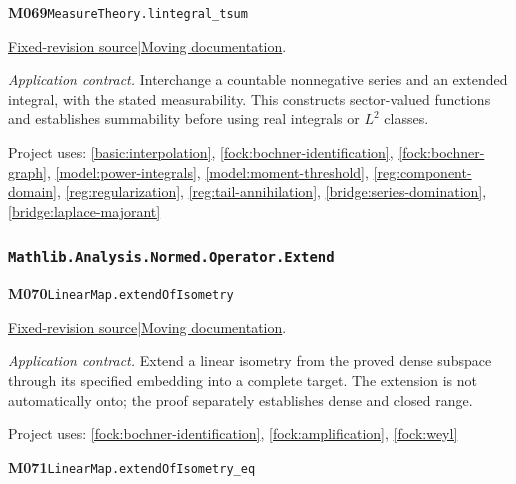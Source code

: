 \documentclass[11pt,a4paper]{article}
\theoremstyle{definition}
\theoremstyle{remark}
\begin{document}
\noindent\textbf{M069}\label{base:M069}\quad\nolinkurl{MeasureTheory.lintegral_tsum}

\href{https://github.com/leanprover-community/mathlib4/blob/9bac2d0692944a775113f7c130fd5e5b4608a854/Mathlib/MeasureTheory/Integral/Lebesgue/Add.lean}{Fixed-revision source}\quad|\quad\href{https://leanprover-community.github.io/mathlib4_docs/Mathlib/MeasureTheory/Integral/Lebesgue/Add.html#MeasureTheory.lintegral_tsum}{Moving documentation}.\par
\noindent\textit{Application contract.} Interchange a countable nonnegative series and an extended integral, with the stated measurability. This constructs sector-valued functions and establishes summability before using real integrals or $L^2$ classes.\par
{\small Project uses: \ref{basic:interpolation}, \ref{fock:bochner-identification}, \ref{fock:bochner-graph}, \ref{model:power-integrals}, \ref{model:moment-threshold}, \ref{reg:component-domain}, \ref{reg:regularization}, \ref{reg:tail-annihilation}, \ref{bridge:series-domination}, \ref{bridge:laplace-majorant}}\par\medskip

\subsubsection*{\nolinkurl{Mathlib.Analysis.Normed.Operator.Extend}}
\noindent\textbf{M070}\label{base:M070}\quad\nolinkurl{LinearMap.extendOfIsometry}

\href{https://github.com/leanprover-community/mathlib4/blob/9bac2d0692944a775113f7c130fd5e5b4608a854/Mathlib/Analysis/Normed/Operator/Extend.lean}{Fixed-revision source}\quad|\quad\href{https://leanprover-community.github.io/mathlib4_docs/Mathlib/Analysis/Normed/Operator/Extend.html#LinearMap.extendOfIsometry}{Moving documentation}.\par
\noindent\textit{Application contract.} Extend a linear isometry from the proved dense subspace through its specified embedding into a complete target. The extension is not automatically onto; the proof separately establishes dense and closed range.\par
{\small Project uses: \ref{fock:bochner-identification}, \ref{fock:amplification}, \ref{fock:weyl}}\par\medskip

\noindent\textbf{M071}\label{base:M071}\quad\nolinkurl{LinearMap.extendOfIsometry_eq}
\end{document}
